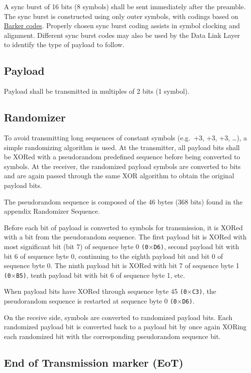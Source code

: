 \documentclass[a4paper,11pt,oneside]{book}
\begin{document}
A sync burst of 16 bits (8 symbols) shall be sent immediately after the preamble. The sync burst is constructed using only outer symbols, with codings based on \href{https://en.wikipedia.org/wiki/Barker_code}{Barker codes}. Properly chosen sync burst coding assists in symbol clocking and alignment. Different sync burst codes may also be used by the Data Link Layer to identify the type of payload to follow.

\subsection{Payload}

Payload shall be transmitted in multiples of 2 bits (1 symbol).

\subsection{Randomizer}

To avoid transmitting long sequences of constant symbols (e.g.~+3, +3, +3, \ldots), a simple randomizing algorithm is used. At the transmitter, all payload bits shall be XORed with a pseudorandom predefined sequence before being converted to symbols. At the receiver, the randomized payload symbols are converted to bits and are again passed through the same XOR algorithm to obtain the original payload bits.

The pseudorandom sequence is composed of the 46 bytes (368 bits) found in the appendix Randomizer Sequence.

Before each bit of payload is converted to symbols for transmission, it is XORed with a bit from the pseudorandom sequence. The first payload bit is XORed with most significant bit (bit 7) of sequence byte 0 \texttt{(0$\times$D6)}, second payload bit with bit 6 of sequence byte 0, continuing to the eighth payload bit and bit 0 of sequence byte 0. The ninth payload bit is XORed with bit 7 of sequence byte 1 \texttt{(0$\times$B5)}, tenth payload bit with bit 6 of sequence byte 1, etc.

When payload bits have XORed through sequence byte 45 \texttt{(0$\times$C3)}, the pseudorandom sequence is restarted at sequence byte 0 \texttt{(0$\times$D6)}.

On the receive side, symbols are converted to randomized payload bits. Each randomized payload bit is converted back to a payload bit by once
again XORing each randomized bit with the corresponding pseudorandom sequence bit.

\subsection{End of Transmission marker (EoT)}
\end{document}
